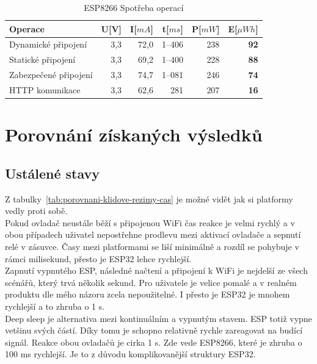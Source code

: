 \documentclass[a4paper, 12pt]{report}
\begin{document}
    \begin{table}[h]
        \centering
        \caption{ESP8266 Spotřeba operací}
        \begin{tabular}{||l| r r r r |r||}
            \hline
            Operace               & U[V] & I[$mA$] & t[$ms$] & P[$mW$] & \textbf{E}[$\mu Wh$] \\
            \hline
            \hline
            Dynamické připojení   & 3,3  & 72,0    & 1--406  & 238     & \textbf{92}          \\
            Statické připojení    & 3,3  & 69,2    & 1--400  & 228     & \textbf{88}          \\
            Zabezpečené připojení & 3,3  & 74,7    & 1--081  & 246     & \textbf{74}          \\
            HTTP komunikace       & 3,3  & 62,6    & 281     & 207     & \textbf{16}          \\
            \hline
        \end{tabular}
        \label{tab:esp32-spotreba-operaci}
    \end{table}


    \section{Porovnání získaných výsledků}

    \subsection{Ustálené stavy}
    Z tabulky~\ref{tab:porovnani-klidove-rezimy-cas} je možné vidět jak si platformy vedly proti sobě. \\
    Pokud ovladač neustále běží s připojenou WiFi čas reakce je velmi rychlý a v obou případech uživatel nepostřehne prodlevu mezi aktivací ovladače a sepnutí relé v zásuvce. Časy mezi platformami se liší minimálně a rozdíl se pohybuje v rámci milisekund, přesto je ESP32 lehce rychlejší. \\
    Zapnutí vypnutého ESP, následné načtení a připojení k WiFi je nejdelší ze všech scénářů, který trvá několik sekund. Pro uživatele je velice pomalé a v realném produktu dle mého názoru zcela nepoužitelné. I přesto je ESP32 je mnohem rychlejší a to zhruba o 1 \si{s}. \\
    Deep sleep je alternativa mezi kontinuálním a vypnutým stavem. ESP totiž vypne vetšinu svých částí. Díky tomu je schopno relativně rychle zareagovat na budící signál. Reakce obou ovladačů je cirka 1 \si{s}. Zde vede ESP8266, které je zhruba o 100 \si{ms} rychlejší. Je to z důvodu komplikovanější struktury ESP32.
\end{document}

